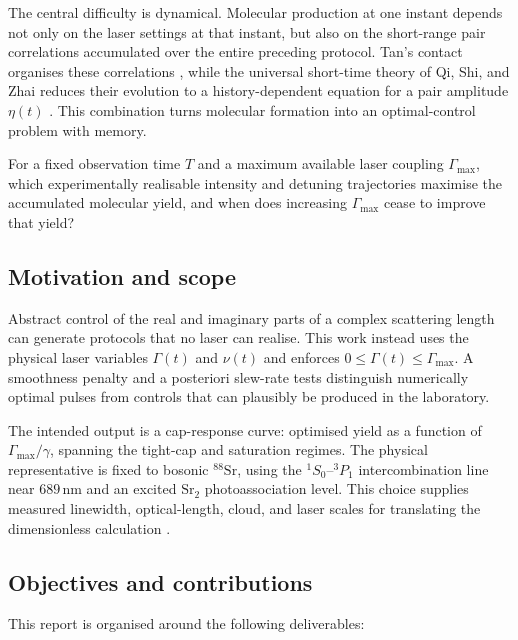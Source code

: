 \documentclass[9pt,a4paper,twocolumn,twoside]{rho-class/rho}
\begin{document}
    The central difficulty is dynamical. Molecular production at one instant depends not only on the laser settings at that instant, but also on the short-range pair correlations accumulated over the entire preceding protocol. Tan's contact organises these correlations \cite{tan2008energetics,braaten2008exact}, while the universal short-time theory of Qi, Shi, and Zhai reduces their evolution to a history-dependent equation for a pair amplitude $\eta(t)$ \cite{qi2021maximum}. This combination turns molecular formation into an optimal-control problem with memory.

    \begin{rhoenv}[frametitle=Central research question]
        For a fixed observation time $T$ and a maximum available laser coupling $\Gamma_{\max}$, which experimentally realisable intensity and detuning trajectories maximise the accumulated molecular yield, and when does increasing $\Gamma_{\max}$ cease to improve that yield?
    \end{rhoenv}

    \subsection{Motivation and scope}

        Abstract control of the real and imaginary parts of a complex scattering length can generate protocols that no laser can realise. This work instead uses the physical laser variables $\Gamma(t)$ and $\nu(t)$ and enforces $0\leq\Gamma(t)\leq\Gamma_{\max}$. A smoothness penalty and a posteriori slew-rate tests distinguish numerically optimal pulses from controls that can plausibly be produced in the laboratory.

        The intended output is a cap-response curve: optimised yield as a function of $\Gamma_{\max}/\gamma$, spanning the tight-cap and saturation regimes. The physical representative is fixed to bosonic $^{88}\mathrm{Sr}$, using the $^1S_0$--$^3P_1$ intercombination line near $689\,\mathrm{nm}$ and an excited $\mathrm{Sr}_2$ photoassociation level. This choice supplies measured linewidth, optical-length, cloud, and laser scales for translating the dimensionless calculation \cite{blatt2011measurement,yan2013controlling}.

    \subsection{Objectives and contributions}

        This report is organised around the following deliverables:
\end{document}
